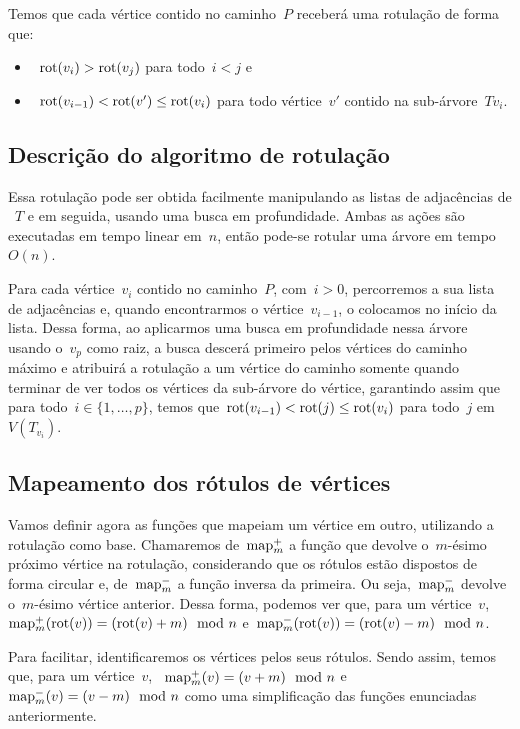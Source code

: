 	\bigskip

	Temos que cada vértice contido no caminho~$P$ receberá 
	uma rotulação de forma que:
	\begin{itemize}
		\item~$\mathrm{rot}(v_i)>\mathrm{rot}(v_j)$ para todo~$i<j$ e
		\item~${\mathrm{rot}(v_{i-1})<\mathrm{rot}(v') \le \mathrm{rot}(v_i)}$ para todo 
		vértice~$v'$ contido na sub-árvore~$T{v_i}$. 
	\end{itemize}

	\bigskip
	\bigskip

	\subsection{Descrição do algoritmo de rotulação}
	Essa rotulação pode ser obtida facilmente 
	manipulando as listas de adjacências de ~$T$ e em seguida,
	usando uma busca em profundidade.
	Ambas as ações são executadas em tempo linear em~$n$, então
	pode-se rotular uma árvore em tempo~$O(n)$.

	Para cada vértice~$v_i$ contido no caminho~$P$, com~$i>0$,
	percorremos a sua lista de adjacências e, quando encontrarmos o 
	vértice~$v_{i-1}$, o colocamos no início da lista.
	Dessa forma, ao aplicarmos uma busca em profundidade nessa 
	árvore usando o~$v_p$ como raiz, a busca descerá primeiro
	pelos vértices do caminho máximo e atribuirá a rotulação
	a um vértice do caminho
	somente quando terminar de ver todos os vértices da sub-árvore
	do vértice, 
	garantindo assim que para todo~$i\in \{1,\ldots, p\}$, temos 
	que~$\mathrm{rot}(v_{i-1})<\mathrm{rot}(j)\le\mathrm{rot}(v_i)$ para todo~$j$ 
	em~$V(T_{v_i})$.
	
	\bigskip
	\bigskip
	\bigskip

	\subsection{Mapeamento dos rótulos de vértices }
	\label{sec:map}
	Vamos definir agora as funções que mapeiam um vértice em 
	outro, utilizando a rotulação como base.
	Chamaremos de~${\mathrm{map}^+_m}$ a função que devolve o~$m$-ésimo 
	próximo vértice na rotulação, considerando que os rótulos
	estão dispostos de forma circular
	e, de~${\mathrm{map}^-_m}$ a função inversa da primeira. 
	Ou seja,~${\mathrm{map}^-_m}$ devolve o~$m$-ésimo vértice anterior.
	Dessa forma, podemos ver que, para um 
	vértice~$v$,~${\mathrm{map}^+_m(\mathrm{rot}(v)) =(\mathrm{rot}(v)+m)\mod n}$ 
	e~${\mathrm{map}^-_m(\mathrm{rot}(v)) =(\mathrm{rot}(v)-m)\mod n}$.

	Para facilitar, identificaremos os vértices pelos seus 
	rótulos. 
	Sendo assim, temos que, para um 
	vértice~$v$, ~${\mathrm{map}^+_m(v) =(v+m)\mod n}$ 
	e~${\mathrm{map}^-_m(v) =(v-m)\mod n}$ como uma simplificação das 
	funções enunciadas anteriormente.

